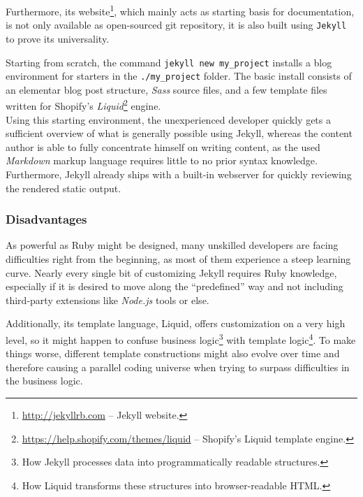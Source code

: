 Furthermore, its website\footnote{\url{http://jekyllrb.com} -- Jekyll website.}, which mainly acts as starting basis for documentation, is not only available as open-sourced git repository, it is also built using \texttt{Jekyll} to prove its universality.

Starting from scratch, the command \texttt{jekyll new my\_project} installs a blog environment for starters in the \texttt{./my\_project} folder. The basic install consists of an elementar blog post structure, \emph{Sass} source files, and a few template files written for Shopify's \emph{Liquid}\footnote{\url{https://help.shopify.com/themes/liquid} -- Shopify's Liquid template engine.} engine.\\
Using this starting environment, the unexperienced developer quickly gets a sufficient overview of what is generally possible using Jekyll, whereas the content author is able to fully concentrate himself on writing content, as the used \emph{Markdown} markup language requires little to no prior syntax knowledge. Furthermore, Jekyll already ships with a built-in webserver for quickly reviewing the rendered static output.

\subsubsection{Disadvantages}
As powerful as Ruby might be designed, many unskilled developers are facing difficulties right from the beginning, as most of them experience a steep learning curve. Nearly every single bit of customizing Jekyll requires Ruby knowledge, especially if it is desired to move along the ``predefined'' way and not including third-party extensions like \emph{Node.js} tools or else.

Additionally, its template language, Liquid, offers customization on a very high level, so it might happen to confuse business logic\footnote{How Jekyll processes data into programmatically readable structures.} with template logic\footnote{How Liquid transforms these structures into browser-readable HTML.}. To make things worse, different template constructions might also evolve over time and therefore causing a parallel coding universe when trying to surpass difficulties in the business logic.

